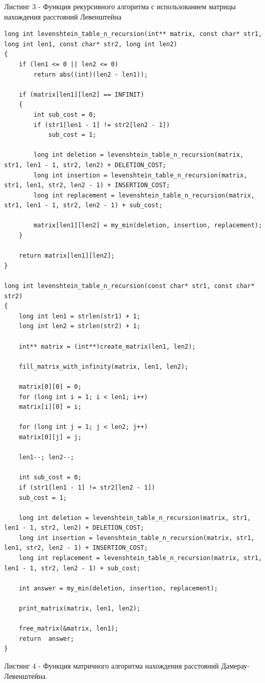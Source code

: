 \documentclass[12pt]{report}
\begin{document}
Листинг 3 - Функция рекурсивного алгоритма с использованием матрицы нахождения расстояний Левенштейна

\begin{lstlisting}
long int levenshtein_table_n_recursion(int** matrix, const char* str1,
long int len1, const char* str2, long int len2)
{
	if (len1 <= 0 || len2 <= 0)
		return abs((int)(len2 - len1));
	
	if (matrix[len1][len2] == INFINIT)
	{
		int sub_cost = 0;
		if (str1[len1 - 1] != str2[len2 - 1])
			sub_cost = 1;
		
		long int deletion = levenshtein_table_n_recursion(matrix, str1, len1 - 1, str2, len2) + DELETION_COST;
		long int insertion = levenshtein_table_n_recursion(matrix, str1, len1, str2, len2 - 1) + INSERTION_COST;
		long int replacement = levenshtein_table_n_recursion(matrix, str1, len1 - 1, str2, len2 - 1) + sub_cost;
		
		matrix[len1][len2] = my_min(deletion, insertion, replacement);
	}
	
	return matrix[len1][len2];
}

long int levenshtein_table_n_recursion(const char* str1, const char* str2)
{
	long int len1 = strlen(str1) + 1;
	long int len2 = strlen(str2) + 1;
	
	int** matrix = (int**)create_matrix(len1, len2);
	
	fill_matrix_with_infinity(matrix, len1, len2);
	
	matrix[0][0] = 0;
	for (long int i = 1; i < len1; i++)
	matrix[i][0] = i;
	
	for (long int j = 1; j < len2; j++)
	matrix[0][j] = j;
	
	len1--; len2--;
	
	int sub_cost = 0;
	if (str1[len1 - 1] != str2[len2 - 1])
	sub_cost = 1;
	
	long int deletion = levenshtein_table_n_recursion(matrix, str1, len1 - 1, str2, len2) + DELETION_COST;
	long int insertion = levenshtein_table_n_recursion(matrix, str1, len1, str2, len2 - 1) + INSERTION_COST;
	long int replacement = levenshtein_table_n_recursion(matrix, str1, len1 - 1, str2, len2 - 1) + sub_cost;
	
	int answer = my_min(deletion, insertion, replacement);
	
	print_matrix(matrix, len1, len2);

	free_matrix(&matrix, len1);
	return  answer;
}
\end{lstlisting}


Листинг 4 - Функция матричного алгоритма нахождения расстояний Дамерау-Левенштейна.
\end{document}
